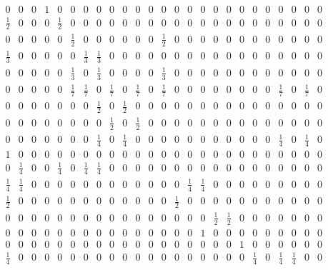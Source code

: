 \documentclass[11pt]{report}
\begin{document}
\begin{appendices}
\begin{figure} [h!]
\begin{equation*}
\begin{array}{ccccccccccccccccccccccccc}
0&0&0&1&0&0&0&0&0&0&0&0&0&0&0&0&0&0&0&0&0&0&0&0&0\\

\frac{1}{2}&0&0&0&\frac{1}{2}&0&0&0&0&0&0&0&0&0&0&0&0&0&0&0&0&0&0&0&0\\

0&0&0&0&0&\frac{1}{2}&0&0&0&0&0&0&\frac{1}{2}&0&0&0&0&0&0&0&0&0&0&0&0\\

\frac{1}{3}&0&0&0&0&0&\frac{1}{3}&\frac{1}{3}&0&0&0&0&0&0&0&0&0&0&0&0&0&0&0&0&0\\

0&0&0&0&0&\frac{1}{3}&0&\frac{1}{3}&0&0&0&0&\frac{1}{3}&0&0&0&0&0&0&0&0&0&0&0&0\\

0&0&0&0&0&\frac{1}{7}&\frac{1}{7}&0&\frac{1}{7}&0&\frac{1}{7}&0&\frac{1}{7}&0&0&0&0&0&0&0&0&\frac{1}{7}&0&\frac{1}{7}&0\\

0&0&0&0&0&0&0&\frac{1}{2}&0&\frac{1}{2}&0&0&0&0&0&0&0&0&0&0&0&0&0&0&0\\

0&0&0&0&0&0&0&0&\frac{1}{2}&0&\frac{1}{2}&0&0&0&0&0&0&0&0&0&0&0&0&0&0\\

0&0&0&0&0&0&0&\frac{1}{4}&0&\frac{1}{4}&0&0&0&0&0&0&0&0&0&0&0&\frac{1}{4}&0&\frac{1}{4}&0\\

1&0&0&0&0&0&0&0&0&0&0&0&0&0&0&0&0&0&0&0&0&0&0&0&0\\

0&\frac{1}{4}&0&0&\frac{1}{4}&0&\frac{1}{4}&\frac{1}{4}&0&0&0&0&0&0&0&0&0&0&0&0&0&0&0&0&0\\

\frac{1}{4}&\frac{1}{4}&0&0&0&0&0&0&0&0&0&0&0&0&\frac{1}{4}&\frac{1}{4}&0&0&0&0&0&0&0&0&0\\

\frac{1}{2}&0&0&0&0&0&0&0&0&0&0&0&0&\frac{1}{2}&0&0&0&0&0&0&0&0&0&0&0\\

0&0&0&0&0&0&0&0&0&0&0&0&0&0&0&0&\frac{1}{2}&\frac{1}{2}&0&0&0&0&0&0&0\\

0&0&0&0&0&0&0&0&0&0&0&0&0&0&0&1&0&0&0&0&0&0&0&0&0\\

0&0&0&0&0&0&0&0&0&0&0&0&0&0&0&0&0&0&1&0&0&0&0&0&0\\

\frac{1}{4}&0&0&0&0&0&0&0&0&0&0&0&0&0&0&0&0&0&0&\frac{1}{4}&0&\frac{1}{4}&\frac{1}{4}&0&0\\


\end{array}
\end{equation*}
\end{figure}
\end{appendices}
\end{document}
